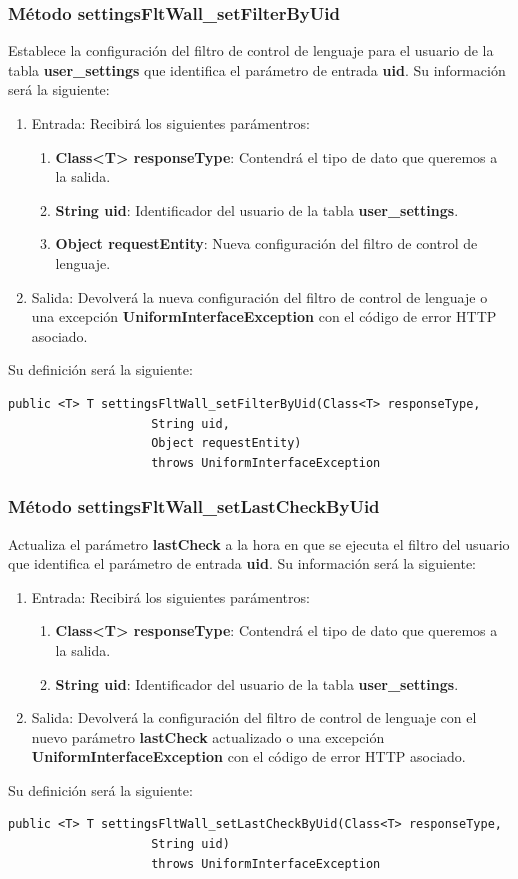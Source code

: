 \subsubsection{Método settingsFltWall\_setFilterByUid}
Establece la configuración del filtro de control de lenguaje para el usuario de la tabla \textbf{user\_settings} que identifica el parámetro de entrada \textbf{uid}. Su información será la siguiente:
\begin{enumerate}
\item Entrada: Recibirá los siguientes parámentros:
\begin{enumerate}
\item \textbf{Class<T> responseType}: Contendrá el tipo de dato que queremos a la salida. 
\item \textbf{String uid}: Identificador del usuario de la tabla \textbf{user\_settings}.
\item \textbf{Object requestEntity}: Nueva configuración del filtro de control de lenguaje.
\end{enumerate}
\item Salida: Devolverá la nueva configuración del filtro de control de lenguaje o una excepción \textbf{UniformInterfaceException} con el código de error HTTP asociado.
\end{enumerate}
\bigskip
\par
Su definición será la siguiente:
\begin{verbatim}public <T> T settingsFltWall_setFilterByUid(Class<T> responseType, 
					String uid, 
					Object requestEntity) 
					throws UniformInterfaceException\end{verbatim}

\subsubsection{Método settingsFltWall\_setLastCheckByUid}
Actualiza el parámetro \textbf{lastCheck} a la hora en que se ejecuta el filtro del usuario que identifica el parámetro de entrada \textbf{uid}. Su información será la siguiente:
\begin{enumerate}
\item Entrada: Recibirá los siguientes parámentros:
\begin{enumerate}
\item \textbf{Class<T> responseType}: Contendrá el tipo de dato que queremos a la salida. 
\item \textbf{String uid}: Identificador del usuario de la tabla \textbf{user\_settings}.
\end{enumerate}
\item Salida: Devolverá la configuración del filtro de control de lenguaje con el nuevo parámetro \textbf{lastCheck} actualizado o una excepción \textbf{UniformInterfaceException} con el código de error HTTP asociado.
\end{enumerate}
\bigskip
\par
Su definición será la siguiente:
\begin{verbatim}public <T> T settingsFltWall_setLastCheckByUid(Class<T> responseType, 
					String uid) 
					throws UniformInterfaceException\end{verbatim}

